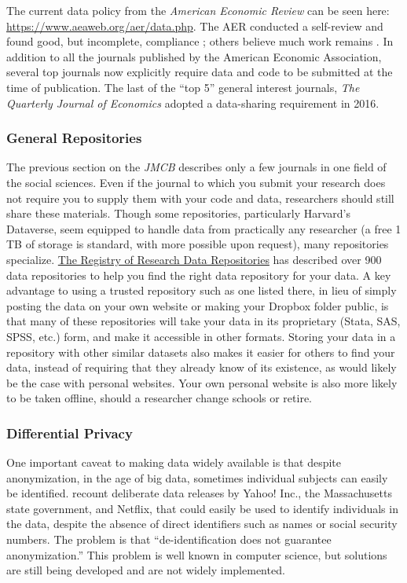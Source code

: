 \documentclass[12pt] {article}
\begin{document}
The current data policy from the \emph{American Economic Review} can be
seen here: \url{https://www.aeaweb.org/aer/data.php}. The AER conducted a self-review and
found good, but incomplete, compliance \citep{glandon_report_2010}; others believe much work remains \citep{anderson_role_2008}. In addition to all
the journals published by the American Economic Association, several top journals now explicitly require data and code to be
submitted at the time of publication. The last of the ``top 5'' general interest journals, \textit{The Quarterly Journal of Economics} adopted a data-sharing requirement in 2016.


\subsubsection{General Repositories}\label{general-repositories}

The previous section on the \emph{JMCB} describes only a few journals in
one field of the social sciences. Even if the journal to which you
submit your research does not require you to supply them with your code
and data, researchers should still share these materials. Though some
repositories, particularly Harvard's Dataverse, seem equipped to handle
data from practically any researcher (a free 1 TB of storage is
standard, with more possible upon request), many repositories specialize. \href{http://www.re3data.org}{The Registry of Research Data Repositories}
has described over 900 data repositories to help you find the right data
repository for your data. A key advantage to using a trusted repository
such as one listed there, in lieu of simply posting the data on your
own website or making your Dropbox folder public, is that many of these
repositories will take your data in its proprietary (Stata, SAS, SPSS,
etc.) form, and make it accessible in other formats. Storing your data in a repository with other similar datasets also makes it easier for others to find your data, instead of requiring that they already know of its existence, as would likely be the case with personal websites. Your own personal website is also more likely to be taken offline, should a researcher change schools or retire.

\subsubsection{Differential Privacy}\label{differential-privacy}

One important caveat to making data widely available is that despite
anonymization, in the age of big data, sometimes individual subjects can
easily be identified. \cite{heffetz_privacy_2014} recount deliberate data
releases by Yahoo! Inc., the Massachusetts state government, and
Netflix, that could easily be used to identify individuals in the data,
despite the absence of direct identifiers such as names or social
security numbers. The problem is that ``de-identification does not
guarantee anonymization.'' This problem is well known in computer science, but solutions are still being developed and are not widely implemented.
\end{document}
